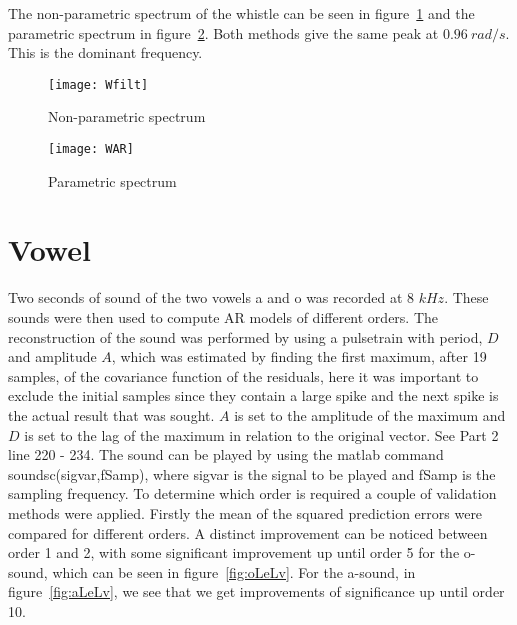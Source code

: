 \documentclass[10pt]{article}
\begin{document}
The non-parametric spectrum of the whistle can be seen in figure~\ref{fig:Wfilt}
and the parametric spectrum in figure~\ref{fig:WAR}. Both methods give the same peak
at $0.96~rad/s$. This is the dominant frequency.


\begin{figure}[!hp]

    \begin{center}
      \texttt{[image: Wfilt]}
    \caption{Non-parametric spectrum \label{fig:Wfilt}}
    \end{center}

\end{figure}

\begin{figure}[!hp]

    \begin{center}
      \texttt{[image: WAR]}
    \caption{Parametric spectrum \label{fig:WAR}}
    \end{center}

\end{figure}

\clearpage

\section{Vowel}
Two seconds of sound of the two vowels a and o was recorded at
8 $kHz$. These sounds were then used to compute AR models of
different orders.
The reconstruction of the sound was performed by using a pulsetrain with period,
$D$ and amplitude $A$, which was estimated by finding the first maximum, after
19 samples, of the covariance function of the residuals, here it was important to
exclude the initial samples since they contain a large spike and the
next spike is the actual result that was sought. $A$ is set to the
amplitude of the maximum and $D$ is set to the lag of the maximum
in relation to the original vector. See Part 2 line 220 - 234.
The sound can be played by using the
matlab command soundsc(sigvar,fSamp), where sigvar is the signal to be played
and fSamp is the sampling frequency.
To determine which order is required a couple of validation
methods were applied. Firstly the mean of the squared prediction errors were compared for different
orders. A distinct improvement can be noticed between order 1 and 2, with some
significant improvement up until order 5 for the o-sound, which can be seen in
figure~\ref{fig:oLeLv}. For the a-sound, in figure~\ref{fig:aLeLv}, we see that
 we get improvements of significance up until order 10.
\end{document}
